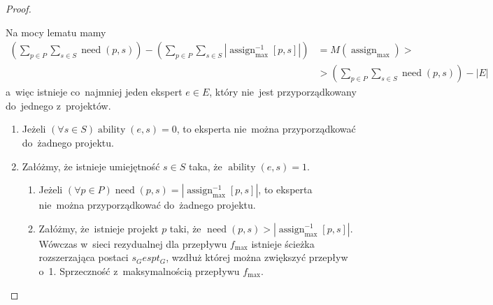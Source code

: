 \documentclass[12pt,a4paper]{article}
\theoremstyle{definition}
\DeclareMathOperator{\ability}{ability}
\DeclareMathOperator{\need}{need}
\DeclareMathOperator{\assign}{assign}
\begin{document}
\begin{proof}
\begin{enumerate}
	Na mocy lematu mamy
	\begin{align*}
	\left( \sum_{p \in P} \sum_{s \in S} \need(p,s) \right) -
	\left(\sum_{p \in P} \sum_{s \in S} \left| \assign_{\max}^{-1} [p,s]\right|\right) 
	&= M(\assign_{\max}) > \\
	&> \left( \sum_{p \in P} \sum_{s \in S} \need(p,s) \right) - |E|
	\end{align*}
	a~więc istnieje co~najmniej jeden ekspert $e \in E$, który nie~jest
	przyporządkowany do~jednego z~projektów.
	\begin{enumerate}
		\item Jeżeli $(\forall s \in S) \ability(e,s) = 0$, to eksperta
		nie~można przyporządkować do~żadnego projektu.
		\item Załóżmy, że istnieje umiejętność $s \in S$ taka, że
		$\ability(e,s) = 1$.
		\begin{enumerate}
			\item Jeżeli $(\forall p \in P) \need(p,s) =
			\left|\assign_{\max}^{-1} [p,s]\right|$, to eksperta nie~można
			przyporządkować do~żadnego projektu.
			\item Załóżmy, że~istnieje projekt $p$ taki, że
			$\need(p,s) > \left|\assign_{\max}^{-1} [p,s]\right|$.
			Wówczas w~sieci rezydualnej dla przepływu $f_{\max}$ istnieje
			ścieżka rozszerzająca postaci $s_G e s p t_G$, wzdłuż której można
			zwiększyć przepływ o~1. Sprzeczność z~maksymalnością przepływu
			$f_{\max}$.
		\end{enumerate}
	\end{enumerate}
\end{enumerate}
\end{proof}
\end{document}
